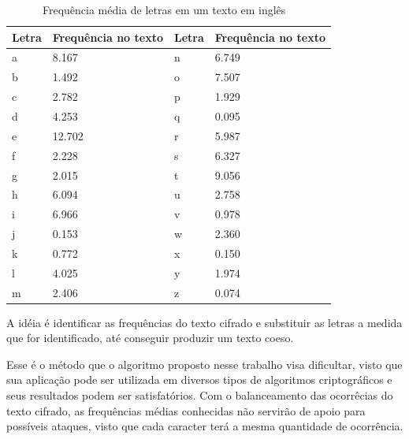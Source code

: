 \begin{table}[h]
\centering
\begin{tabular}{|l|l|l|l|}
	\hline
	Letra & Frequência no texto & Letra & Frequência no texto \\ \hline
	a & 8.167 & n & 6.749 \\ \hline
	b & 1.492 & o & 7.507 \\ \hline
	c & 2.782 & p & 1.929 \\ \hline
	d & 4.253 & q & 0.095 \\ \hline
	e & 12.702 & r & 5.987 \\ \hline
	f & 2.228 & s & 6.327 \\ \hline
	g & 2.015 & t & 9.056 \\ \hline
	h & 6.094 & u & 2.758 \\ \hline
	i & 6.966 & v & 0.978 \\ \hline
	j & 0.153 & w & 2.360 \\ \hline
	k & 0.772 & x & 0.150 \\ \hline
	l & 4.025 & y & 1.974 \\ \hline
	m & 2.406 & z & 0.074 \\ \hline
\end{tabular}
\caption[{Frequência média de letras em um texto em inglês}]{Frequência média de letras em um texto em inglês ~\cite{robert-lewand}} 
\end{table}

A idéia é identificar as frequências do texto cifrado e substituir as letras a medida que for identificado, até conseguir produzir um texto coeso.

Esse é o método que o algoritmo proposto nesse trabalho visa dificultar, visto que sua aplicação pode ser utilizada em diversos tipos de algoritmos criptográficos e seus resultados podem ser satisfatórios. Com o balanceamento das ocorrêcias do texto cifrado, as frequências médias conhecidas não servirão de apoio para possíveis ataques, visto que cada caracter terá a mesma quantidade de ocorrência.